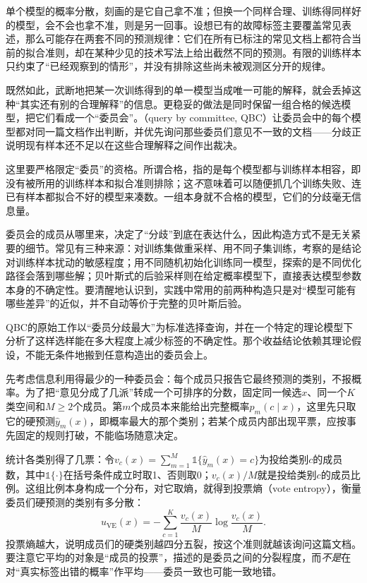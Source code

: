 单个模型的概率分散，刻画的是它自己拿不准；但换一个同样合理、训练得同样好的模型，会不会也拿不准，则是另一回事。设想已有的故障标签主要覆盖常见表述，那么可能存在两套不同的预测规律：它们在所有已标注的常见文档上都符合当前的拟合准则，却在某种少见的技术写法上给出截然不同的预测。有限的训练样本只约束了“已经观察到的情形”，并没有排除这些尚未被观测区分开的规律。

既然如此，武断地把某一次训练得到的单一模型当成唯一可能的解释，就会丢掉这种“其实还有别的合理解释”的信息。更稳妥的做法是同时保留一组合格的候选模型，把它们看成一个“委员会”。（query by committee, QBC）让委员会中的每个模型都对同一篇文档作出判断，并优先询问那些委员们意见不一致的文档——分歧正说明现有样本还不足以在这些合理解释之间作出裁决。

这里要严格限定“委员”的资格。所谓合格，指的是每个模型都与训练样本相容，即没有被所用的训练样本和拟合准则排除；这\emph{不}意味着可以随便抓几个训练失败、连已有样本都拟合不好的模型来凑数。一组本身就不合格的模型，它们的分歧毫无信息量。

委员会的成员从哪里来，决定了“分歧”到底在表达什么，因此构造方式不是无关紧要的细节。常见有三种来源：对训练集做重采样、用不同子集训练，考察的是结论对训练样本扰动的敏感程度；用不同随机初始化训练同一模型，探索的是不同优化路径会落到哪些解；贝叶斯式的后验采样则在给定概率模型下，直接表达模型参数本身的不确定性。要清醒地认识到，实践中常用的前两种构造只是对“模型可能有哪些差异”的近似，并不自动等价于完整的贝叶斯后验。

QBC的原始工作以“委员分歧最大”为标准选择查询，并在一个特定的理论模型下分析了这样选样能在多大程度上减少标签的不确定性。那个收益结论依赖其理论假设，不能无条件地搬到任意构造出的委员会上。

先考虑信息利用得最少的一种委员会：每个成员只报告它最终预测的类别，不报概率。为了把“意见分成了几派”转成一个可排序的分数，固定同一候选$x$、同一个$K$类空间和$M\geq2$个成员。第$m$个成员本来能给出完整概率$p_m(c\mid x)$，这里先只取它的硬预测$\widehat y_m(x)$，即概率最大的那个类别；若某个成员内部出现平票，应按事先固定的规则打破，不能临场随意决定。

统计各类别得了几票：令$v_c(x)=\sum_{m=1}^{M}\mathbb{1}\{\widehat y_m(x)=c\}$为投给类别$c$的成员数，其中$\mathbb{1}\{\cdot\}$在括号条件成立时取1、否则取0；$v_c(x)/M$就是投给类别$c$的成员比例。这组比例本身构成一个分布，对它取熵，就得到投票熵（vote entropy），衡量委员们硬预测的类别有多分散：
\begin{equation}
  u_{\mathrm{VE}}(x)
  =-\sum_{c=1}^{K}\frac{v_c(x)}{M}
    \log\frac{v_c(x)}{M}.
  \label{eq:knowledge-acquisition-human-vote-entropy}
\end{equation}
投票熵越大，说明成员们的硬类别越四分五裂，按这个准则就越该询问这篇文档。要注意它平均的对象是“成员的投票”，描述的是委员之间的分裂程度，而\emph{不是}在对“真实标签出错的概率”作平均——委员一致也可能一致地错。

